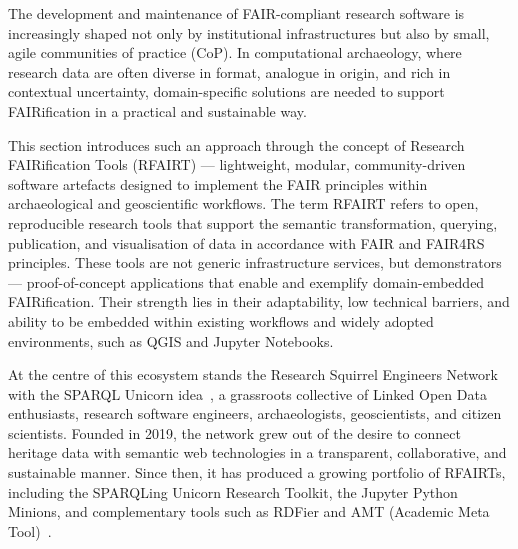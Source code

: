 \documentclass{eceasst}
\begin{document}
The development and maintenance of FAIR-compliant research software is increasingly shaped not only by institutional infrastructures but also by small, agile communities of practice (CoP). In computational archaeology, where research data are often diverse in format, analogue in origin, and rich in contextual uncertainty, domain-specific solutions are needed to support FAIRification in a practical and sustainable way. 

This section introduces such an approach through the concept of Research FAIRification Tools (RFAIRT) — lightweight, modular, community-driven software artefacts designed to implement the FAIR principles within archaeological and geoscientific workflows. The term RFAIRT refers to open, reproducible research tools that support the semantic transformation, querying, publication, and visualisation of data in accordance with FAIR and FAIR4RS principles. These tools are not generic infrastructure services, but demonstrators — proof-of-concept applications that enable and exemplify domain-embedded FAIRification. Their strength lies in their adaptability, low technical barriers, and ability to be embedded within existing workflows and widely adopted environments, such as QGIS and Jupyter Notebooks. 

At the centre of this ecosystem stands the Research Squirrel Engineers Network with the SPARQL Unicorn idea~\cite{thiery_sparql_2020}, a grassroots collective of Linked Open Data enthusiasts, research software engineers, archaeologists, geoscientists, and citizen scientists. Founded in 2019, the network grew out of the desire to connect heritage data with semantic web technologies in a transparent, collaborative, and sustainable manner. Since then, it has produced a growing portfolio of RFAIRTs, including the SPARQLing Unicorn Research Toolkit, the Jupyter Python Minions, and complementary tools such as RDFier and AMT (Academic Meta Tool)~\cite{unold_academic_2019}. 
\end{document}
